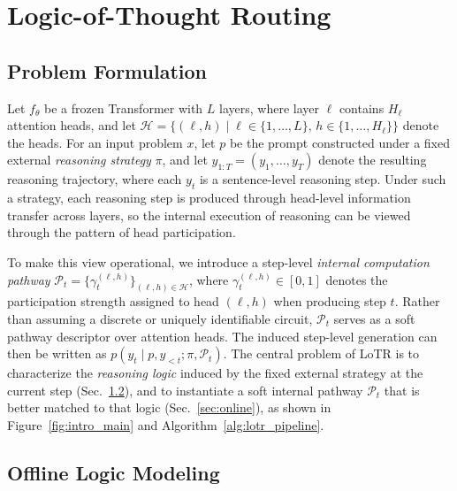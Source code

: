 \section{Logic-of-Thought Routing}
\label{sec:lotr}

\subsection{Problem Formulation}
\label{sec:formulation}

Let $f_\theta$ be a frozen Transformer with $L$ layers, where layer $\ell$ contains $H_\ell$ attention heads, and let $\mathcal{H}=\{(\ell,h)\mid \ell\in\{1,\dots,L\},\, h\in\{1,\dots,H_\ell\}\}$ denote the heads. For an input problem $x$, let $p$ be the prompt constructed under a fixed external \emph{reasoning strategy} $\pi$, and let $y_{1:T}=(y_1,\ldots,y_T)$ denote the resulting reasoning trajectory, where each $y_t$ is a sentence-level reasoning step. 
Under such a strategy, each reasoning step is produced through head-level information transfer across layers, so the internal execution of reasoning can be viewed through the pattern of head participation.

To make this view operational, we introduce a step-level \emph{internal computation pathway} 
$\mathcal{P}_t=\{\gamma_t^{(\ell,h)}\}_{(\ell,h)\in\mathcal{H}}$, 
where $\gamma_t^{(\ell,h)}\in[0,1]$ denotes the participation strength assigned to head $(\ell,h)$ when producing step $t$.
Rather than assuming a discrete or uniquely identifiable circuit, $\mathcal{P}_t$ serves as a soft pathway descriptor over attention heads.
The induced step-level generation can then be written as 
$p(y_t\mid p,y_{<t};\pi,\mathcal{P}_t)$.
The central problem of LoTR is to characterize the \emph{reasoning logic} induced by the fixed external strategy at the current step (Sec.~\ref{sec:offline}), and to instantiate a soft internal pathway $\mathcal{P}_t$ that is better matched to that logic (Sec.~\ref{sec:online}), as shown in Figure~\ref{fig:intro_main} and Algorithm~\ref{alg:lotr_pipeline}.
\vspace{-0.5mm}

\subsection{Offline Logic Modeling}
\label{sec:offline}
\vspace{-0.5mm}

